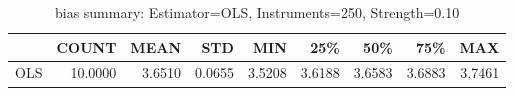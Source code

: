 \begin{table}[ht]
\centering
\caption{bias summary: Estimator=OLS, Instruments=250, Strength=0.10}
\begin{tabular}{lrrrrrrrr}
\toprule
 & COUNT & MEAN & STD & MIN & 25\% & 50\% & 75\% & MAX \\
\midrule
OLS & 10.0000 & 3.6510 & 0.0655 & 3.5208 & 3.6188 & 3.6583 & 3.6883 & 3.7461 \\
\bottomrule
\end{tabular}
\end{table}
